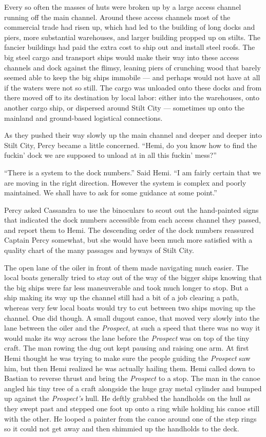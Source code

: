 \documentclass[
]{scrbook}
\begin{document}
Every so often the masses of huts were broken up by a large access
channel running off the main channel. Around these access channels most
of the commercial trade had risen up, which had led to the building of
long docks and piers, more substantial warehouses, and larger building
propped up on stilts. The fancier buildings had paid the extra cost to
ship out and install steel roofs. The big steel cargo and transport
ships would make their way into these access channels and dock against
the flimsy, leaning piers of crunching wood that barely seemed able to
keep the big ships immobile --- and perhaps would not have at all if the
waters were not so still. The cargo was unloaded onto these docks and
from there moved off to its destination by local labor: either into the
warehouses, onto another cargo ship, or dispersed around Stilt City ---
sometimes up onto the mainland and ground-based logistical connections.

As they pushed their way slowly up the main channel and deeper and
deeper into Stilt City, Percy became a little concerned. ``Hemi, do you
know how to find the fuckin' dock we are supposed to unload at in all
this fuckin' mess?''

``There is a system to the dock numbers.'' Said Hemi. ``I am fairly
certain that we are moving in the right direction. However the system is
complex and poorly maintained. We shall have to ask for some guidance at
some point.''

Percy asked Cassandra to use the binoculars to scout out the
hand-painted signs that indicated the dock numbers accessible from each
access channel they passed, and report them to Hemi. The descending
order of the dock numbers reassured Captain Percy somewhat, but she
would have been much more satisfied with a quality chart of the many
passages and byways of Stilt City.

The open lane of the oiler in front of them made navigating much easier.
The local boats generally tried to stay out of the way of the bigger
ships knowing that the big ships were far less maneuverable and took
much longer to stop. But a ship making its way up the channel still had
a bit of a job clearing a path, whereas very few local boats would try
to cut between two ships moving up the channel. One did though. A small
dugout canoe, that moved very slowly into the lane between the oiler and
the \emph{Prospect}, at such a speed that there was no way it would make
its way across the lane before the \emph{Prospect} was on top of the
tiny craft. The man rowing the dug out kept pausing and raising one arm.
At first Hemi thought he was trying to make sure the people guiding the
\emph{Prospect} saw him, but then Hemi realized he was actually hailing
them. Hemi called down to Bastian to reverse thrust and bring the
\emph{Prospect} to a stop. The man in the canoe angled his tiny tree of
a craft alongside the huge gray metal cylinder and bumped up against the
\emph{Prospect's} hull. He deftly grabbed the handholds on the hull as
they swept past and stepped one foot up onto a ring while holding his
canoe still with the other. He looped a painter from the canoe around
one of the step rings so it could not get away and then shimmied up the
handholds to the deck.
\end{document}
